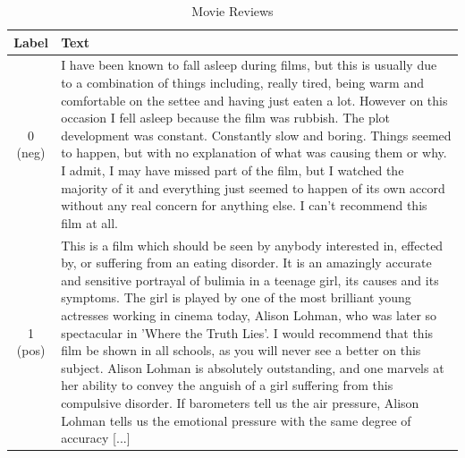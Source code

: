 \documentclass[12pt,a4paper]{report}
\begin{document}
\begin{table}[h!]
  \centering
  \begin{tabular}{|c|p{12cm}|}
    \hline
    \textbf{Label} & \textbf{Text}                                                                                                                                                                                                                                                                                                                                                                                                                                                                                                                                                                                                                                                                                                                                                                           \\
    \hline
    0 (neg)        & I have been known to fall asleep during films, but this is usually due to a combination of things including, really tired, being warm and comfortable on the settee and having just eaten a lot. However on this occasion I fell asleep because the film was rubbish. The plot development was constant. Constantly slow and boring. Things seemed to happen, but with no explanation of what was causing them or why. I admit, I may have missed part of the film, but I watched the majority of it and everything just seemed to happen of its own accord without any real concern for anything else. I can't recommend this film at all.                                                                                                                                             \\
    \hline
    1 (pos)        & This is a film which should be seen by anybody interested in, effected by, or suffering from an eating disorder. It is an amazingly accurate and sensitive portrayal of bulimia in a teenage girl, its causes and its symptoms. The girl is played by one of the most brilliant young actresses working in cinema today, Alison Lohman, who was later so spectacular in 'Where the Truth Lies'. I would recommend that this film be shown in all schools, as you will never see a better on this subject. Alison Lohman is absolutely outstanding, and one marvels at her ability to convey the anguish of a girl suffering from this compulsive disorder. If barometers tell us the air pressure, Alison Lohman tells us the emotional pressure with the same degree of accuracy [...] \\
    \hline
  \end{tabular}
  \caption{Movie Reviews\protect\footnotemark}
  \label{table:negative_reviews}
\end{table}
\end{document}
